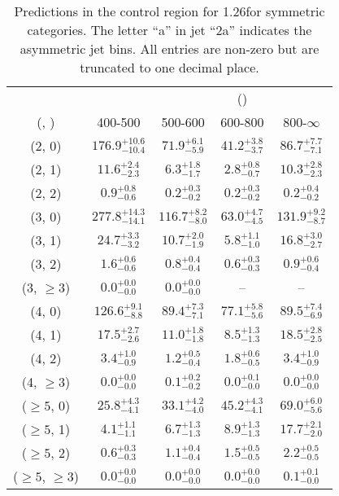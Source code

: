 \begin{table}[h!]
\tiny
\centering
\caption{Predictions in the \gj control region for 1.26\ifb for symmetric categories. The letter ``a'' in jet \eg ``2a''  indicates the asymmetric jet bins. All entries are non-zero but are truncated to one decimal place.\label{tab:predsep_gj_ewk_sym}}
\begin{tabular}
{ccccc}
	\hline\hline
&	& \multicolumn{4}{c}{\scalht (\gev)} \\ 
	 (\njet,  \nb) & 400-500 & 500-600 & 600-800 & 800-$\infty$ \\ [0.8ex] 
\hline
	(2, 0) & $176.9^{+ 10.6 }_{- 10.4 }$ & $71.9^{+ 6.1 }_{- 5.9 }$ & $41.2^{+ 3.8 }_{- 3.7 }$ & $86.7^{+ 7.7 }_{- 7.1 }$ \\[0.5ex] 
	(2, 1) & $11.6^{+ 2.4 }_{- 2.3 }$ & $6.3^{+ 1.8 }_{- 1.7 }$ & $2.8^{+ 0.8 }_{- 0.7 }$ & $10.3^{+ 2.8 }_{- 2.3 }$ \\[0.5ex] 
	(2, 2) & $0.9^{+ 0.8 }_{- 0.6 }$ & $0.2^{+ 0.3 }_{- 0.2 }$ & $0.2^{+ 0.3 }_{- 0.2 }$ & $0.2^{+ 0.4 }_{- 0.2 }$ \\[0.5ex] 
	(3, 0) & $277.8^{+ 14.3 }_{- 14.1 }$ & $116.7^{+ 8.2 }_{- 8.0 }$ & $63.0^{+ 4.7 }_{- 4.5 }$ & $131.9^{+ 9.2 }_{- 8.7 }$ \\[0.5ex] 
	(3, 1) & $24.7^{+ 3.3 }_{- 3.2 }$ & $10.7^{+ 2.0 }_{- 1.9 }$ & $5.8^{+ 1.1 }_{- 1.0 }$ & $16.8^{+ 3.0 }_{- 2.7 }$ \\[0.5ex] 
	(3, 2) & $1.6^{+ 0.6 }_{- 0.6 }$ & $0.8^{+ 0.4 }_{- 0.4 }$ & $0.6^{+ 0.3 }_{- 0.3 }$ & $0.9^{+ 0.6 }_{- 0.4 }$ \\[0.5ex] 
	(3, $\ge3$) & $0.0^{+ 0.0 }_{- 0.0 }$ & $0.0^{+ 0.0 }_{- 0.0 }$ & -- & -- \\[0.5ex] 
	(4, 0) & $126.6^{+ 9.1 }_{- 8.8 }$ & $89.4^{+ 7.3 }_{- 7.1 }$ & $77.1^{+ 5.8 }_{- 5.6 }$ & $89.5^{+ 7.4 }_{- 6.9 }$ \\[0.5ex] 
	(4, 1) & $17.5^{+ 2.7 }_{- 2.6 }$ & $11.0^{+ 1.8 }_{- 1.8 }$ & $8.5^{+ 1.3 }_{- 1.3 }$ & $18.5^{+ 2.8 }_{- 2.5 }$ \\[0.5ex] 
	(4, 2) & $3.4^{+ 1.0 }_{- 0.9 }$ & $1.2^{+ 0.5 }_{- 0.4 }$ & $1.8^{+ 0.6 }_{- 0.5 }$ & $3.4^{+ 1.0 }_{- 0.9 }$ \\[0.5ex] 
	(4, $\ge3$) & $0.0^{+ 0.0 }_{- 0.0 }$ & $0.1^{+ 0.2 }_{- 0.2 }$ & $0.0^{+ 0.1 }_{- 0.0 }$ & $0.0^{+ 0.0 }_{- 0.0 }$ \\[0.5ex] 
	($\ge5$, 0) & $25.8^{+ 4.3 }_{- 4.1 }$ & $33.1^{+ 4.2 }_{- 4.0 }$ & $45.2^{+ 4.3 }_{- 4.1 }$ & $69.0^{+ 6.0 }_{- 5.6 }$ \\[0.5ex] 
	($\ge5$, 1) & $4.1^{+ 1.1 }_{- 1.1 }$ & $6.7^{+ 1.3 }_{- 1.3 }$ & $8.9^{+ 1.3 }_{- 1.3 }$ & $17.7^{+ 2.1 }_{- 2.0 }$ \\[0.5ex] 
	($\ge5$, 2) & $0.6^{+ 0.3 }_{- 0.3 }$ & $1.1^{+ 0.4 }_{- 0.4 }$ & $1.5^{+ 0.5 }_{- 0.5 }$ & $2.2^{+ 0.5 }_{- 0.5 }$ \\[0.5ex] 
	($\ge5$, $\ge3$) & $0.0^{+ 0.0 }_{- 0.0 }$ & $0.0^{+ 0.0 }_{- 0.0 }$ & $0.0^{+ 0.0 }_{- 0.0 }$ & $0.1^{+ 0.1 }_{- 0.0 }$ \\[0.5ex] 
	\hline
	\hline
\end{tabular}
\end{table}

